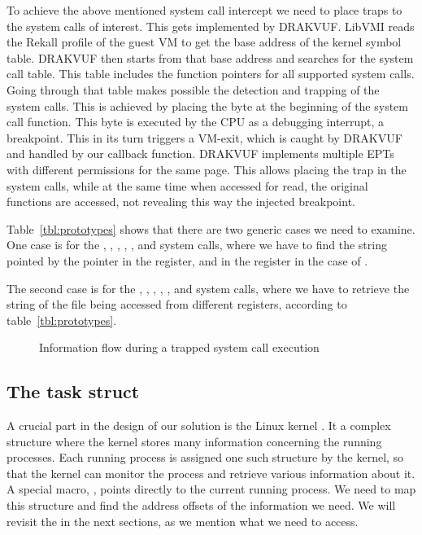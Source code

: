 To achieve the above mentioned system call intercept we need to place traps to the system calls of interest. This gets implemented by DRAKVUF. LibVMI reads the Rekall profile of the guest \ac{VM} to get the base address of the kernel symbol table. DRAKVUF then starts from that base address and searches for the system call table. This table includes the function pointers for all supported system calls. Going through that table makes possible the detection and trapping of the system calls. This is achieved by placing the  byte at the beginning of the system call function. This byte is executed by the \ac{CPU} as a debugging interrupt, a breakpoint. This in its turn triggers a VM-exit, which is caught by DRAKVUF and handled by our callback function. DRAKVUF implements multiple \ac{EPT}s with different permissions for the same page. This allows placing the trap in the system calls, while at the same time when accessed for read, the original functions are accessed, not revealing this way the injected breakpoint.

\par Table~\ref{tbl:prototypes} shows that there are two generic cases we need to examine. One case is for the , , , , , and  system calls, where we have to find the string pointed by the pointer in the  register, and in the  register in the case of . 

\par The second case is for the , , , , , and  system calls, where we have to retrieve the string of the file being accessed from different registers, according to table~\ref{tbl:prototypes}. 

\begin{figure}[ht]
	\centering
	
	\caption{Information flow during a trapped system call execution}
	\label{fig:overview}
\end{figure}


\subsection{The task struct}\label{sub:struct}
A crucial part in the design of our solution is the Linux kernel . It a complex structure where the kernel stores many information concerning the running processes. Each running process is assigned one such structure by the kernel, so that the kernel can monitor the process and retrieve various information about it. A special macro, , points directly to the current running process. We need to map this structure and find the address offsets of the information we need. We will revisit the  in the next sections, as we mention what we need to access.


